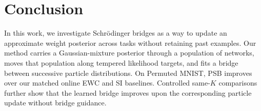 \documentclass{article}
\begin{document}

\section{Conclusion}

In this work, we investigate Schr\"odinger bridges as a way to update an
approximate weight posterior across tasks without retaining past examples.
Our method carries a Gaussian-mixture posterior through a population of
networks, moves that population along tempered likelihood targets, and
fits a bridge between successive particle distributions. On Permuted MNIST,
PSB improves over our matched online EWC and SI baselines. Controlled same-$K$ comparisons further show that the learned bridge improves upon the corresponding particle update without bridge guidance. 



\end{document}
